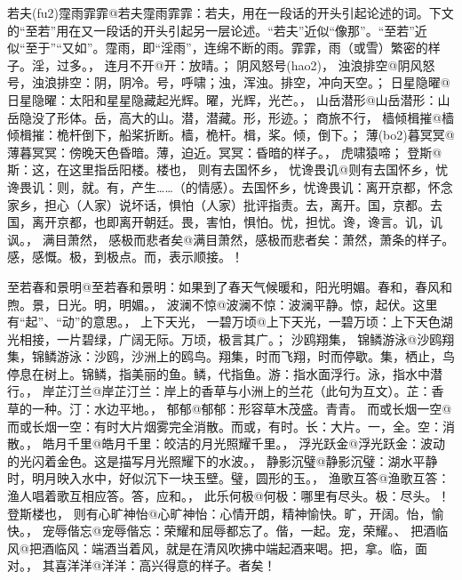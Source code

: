 \documentclass[a4paper]{article}
\begin{document}
若夫(fu2)霪雨霏霏@{若夫霪雨霏霏：若夫，用在一段话的开头引起论述的词。下文的“至若”用在又一段话的开头引起另一层论述。“若夫”近似“像那”。“至若”近似“至于”“又如”。霪雨，即“淫雨”，连绵不断的雨。霏霏，雨（或雪）繁密的样子。淫，过多。}，
连月不开@{开：放晴。}；
阴风怒号(hao2)，
浊浪排空@{阴风怒号，浊浪排空：阴，阴冷。号，呼啸；浊，浑浊。排空，冲向天空。}；
日星隐曜@{日星隐曜：太阳和星星隐藏起光辉。曜，光辉，光芒。}，
山岳潜形@{山岳潜形：山岳隐没了形体。岳，高大的山。潜，潜藏。形，形迹。}；
商旅不行，
樯倾楫摧@{樯倾楫摧：桅杆倒下，船桨折断。樯，桅杆。楫，桨。倾，倒下。}；
薄(bo2)暮冥冥@{薄暮冥冥：傍晚天色昏暗。薄，迫近。冥冥：昏暗的样子。}，
虎啸猿啼；
登斯@{斯：这，在这里指岳阳楼。}楼也，
则有去国怀乡，
忧谗畏讥@{则有去国怀乡，忧谗畏讥：则，就。有，产生……（的情感）。去国怀乡，忧谗畏讥：离开京都，怀念家乡，担心（人家）说坏话，惧怕（人家）批评指责。去，离开。国，京都。去国，离开京都，也即离开朝廷。畏，害怕，惧怕。忧，担忧。谗，谗言。讥，讥讽。}，
满目萧然，
感极而悲者矣@{满目萧然，感极而悲者矣：萧然，萧条的样子。感，感慨。极，到极点。而，表示顺接。}！

至若春和景明@{至若春和景明：如果到了春天气候暖和，阳光明媚。春和，春风和煦。景，日光。明，明媚。}，
波澜不惊@{波澜不惊：波澜平静。惊，起伏。这里有“起”、“动”的意思。}，
上下天光，
一碧万顷@{上下天光，一碧万顷：上下天色湖光相接，一片碧绿，广阔无际。万顷，极言其广。}；
沙鸥翔集，
锦鳞游泳@{沙鸥翔集，锦鳞游泳：沙鸥，沙洲上的鸥鸟。翔集，时而飞翔，时而停歇。集，栖止，鸟停息在树上。锦鳞，指美丽的鱼。鳞，代指鱼。游：指水面浮行。泳，指水中潜行。}，
岸芷汀兰@{岸芷汀兰：岸上的香草与小洲上的兰花（此句为互文）。芷：香草的一种。汀：水边平地。}，
郁郁@{郁郁：形容草木茂盛。}青青。
而或长烟一空@{而或长烟一空：有时大片烟雾完全消散。而或，有时。长：大片。一，全。空：消散。}，
皓月千里@{皓月千里：皎洁的月光照耀千里。}，
浮光跃金@{浮光跃金：波动的光闪着金色。这是描写月光照耀下的水波。}，
静影沉璧@{静影沉璧：湖水平静时，明月映入水中，好似沉下一块玉壁。璧，圆形的玉。}，
渔歌互答@{渔歌互答：渔人唱着歌互相应答。答，应和。}，
此乐何极@{何极：哪里有尽头。极：尽头。}！
登斯楼也，
则有心旷神怡@{心旷神怡：心情开朗，精神愉快。旷，开阔。怡，愉快。}，
宠辱偕忘@{宠辱偕忘：荣耀和屈辱都忘了。偕，一起。宠，荣耀。}、
把酒临风@{把酒临风：端酒当着风，就是在清风吹拂中端起酒来喝。把，拿。临，面对。}，
其喜洋洋@{洋洋：高兴得意的样子。}者矣！
\end{document}
